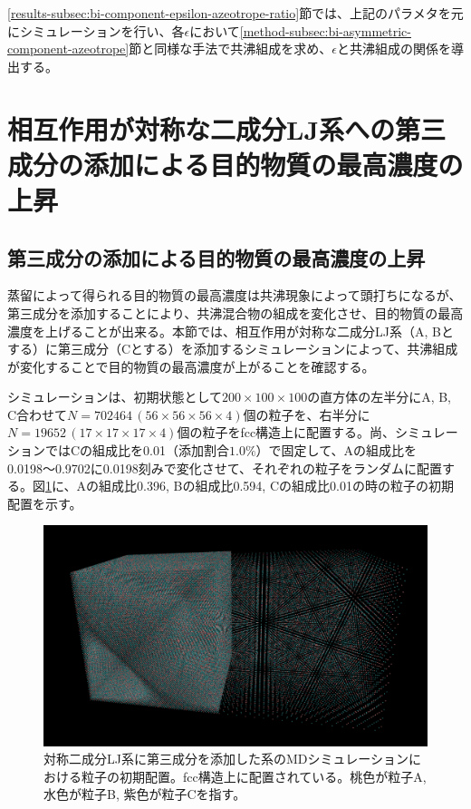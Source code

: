 \documentclass[titlepage]{jsreport}
\begin{document}
\newpage
\ref{results-subsec:bi-component-epsilon-azeotrope-ratio}節では、上記のパラメタを元にシミュレーションを行い、各$\epsilon$において\ref{method-subsec:bi-asymmetric-component-azeotrope}節と同様な手法で共沸組成を求め、$\epsilon$と共沸組成の関係を導出する。


\section{相互作用が対称な二成分LJ系への第三成分の添加による目的物質の最高濃度の上昇} \label{method-sec:bi-component-addition-of-3rd-component-highest-purity}
\subsection{第三成分の添加による目的物質の最高濃度の上昇} \label{method-subsec:bi-component-addition-of-3rd-component-highest-purity}
蒸留によって得られる目的物質の最高濃度は共沸現象によって頭打ちになるが、第三成分を添加することにより、共沸混合物の組成を変化させ、目的物質の最高濃度を上げることが出来る\cite{azeotrope-add_third_component}。本節では、相互作用が対称な二成分LJ系（A, Bとする）に第三成分（Cとする）を添加するシミュレーションによって、共沸組成が変化することで目的物質の最高濃度が上がることを確認する。

シミュレーションは、初期状態として$200×100×100$の直方体の左半分にA, B, C合わせて$N=702464\,(56×56×56×4)$個の粒子を、右半分に$N=19652\,(17×17×17×4)$個の粒子をfcc構造上に配置する。尚、シミュレーションではCの組成比を0.01（添加割合$1.0\%$）で固定して、Aの組成比を0.0198〜0.9702に0.0198刻みで変化させて、それぞれの粒子をランダムに配置する。図\ref{fig:lan278176-lbn417263-lcn7025-ran7782-rbn11673-rcn197-first}に、Aの組成比0.396, Bの組成比0.594, Cの組成比0.01の時の粒子の初期配置を示す。

\begin{figure}[htbp]
    \begin{center}
        \includegraphics[width=14cm]{fig/lan278176-lbn417263-lcn7025-ran7782-rbn11673-rcn197/lan278176-lbn417263-lcn7025-ran7782-rbn11673-rcn197-first.png}
    \end{center}
    \caption{対称二成分LJ系に第三成分を添加した系のMDシミュレーションにおける粒子の初期配置。fcc構造上に配置されている。桃色が粒子A, 水色が粒子B, 紫色が粒子Cを指す。}
    \label{fig:lan278176-lbn417263-lcn7025-ran7782-rbn11673-rcn197-first}
\end{figure}
\end{document}
